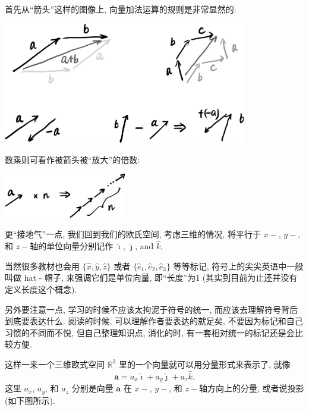 首先从``箭头''这样的图像上, 向量加法运算的规则是非常显然的:

\begin{tcolorbox}[size=fbox, breakable, enhanced jigsaw]
  \includegraphics[width=0.8\textwidth]{img/image-20231128153431774.png}
\end{tcolorbox}

数乘则可看作被箭头被``放大''的倍数:

\begin{tcolorbox}[size=fbox, breakable, enhanced jigsaw]
  \includegraphics[width=0.4\textwidth]{img/image-20231128154149363.png}
\end{tcolorbox}

更``接地气''一点, 我们回到我们的欧氏空间, 考虑三维的情况, 将平行于
$x-$, $y-$, 和 $z-$轴的单位向量分别记作 $\hat{\imath}$,
$\hat{\jmath}$, and $\hat{k}$,

\begin{newquote}
当然很多教材也会用 $\{\hat{x},\hat{y},\hat{z}\}$ 或者
$\{\hat{e}_1,\hat{e}_2,\hat{e}_3\}$ 等等标记,
符号上的尖尖英语中一般叫做 hat - 帽子, 来强调它们是单位向量,
即``长度''为1 (其实到目前为止还并没有定义长度这个概念).

另外要注意一点, 学习的时候不应该太拘泥于符号的统一,
而应该去理解符号背后到底要表达什么. 阅读的时候,
可以理解作者要表达的就足矣, 不要因为标记和自己习惯的不同而不悦,
但自己整理知识点, 消化的时, 有一套相对统一的标记还是会比较方便.
\end{newquote}

这样一来一个三维欧式空间 $\mathbb{R}^3$
里的一个向量就可以用分量形式来表示了, 就像 \[
\boldsymbol{a}=a_x\hat{\imath}+a_y\hat{\jmath}+a_z\hat{k}.
\] 这里 $a_x$, $a_y$, 和 $a_z$ 分别是向量 $\boldsymbol{a}$ 在
$x-$, $y-$, 和 $z-$轴方向上的分量, 或者说投影 (如下图所示).


